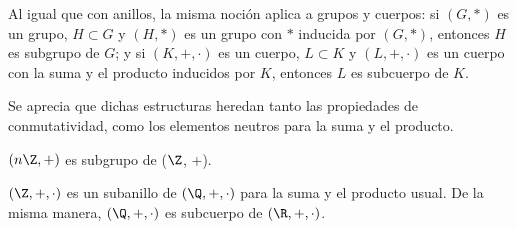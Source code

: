 \begin{TFGampliado}
    \begin{obss}
        \item Al igual que con anillos, la misma noción aplica a grupos y cuerpos: si $(G,\ast)$ es un grupo, $H \subset G$ y $(H,\ast)$ es un grupo con $\ast$ inducida por $(G,\ast)$, entonces $H$ es subgrupo de $G$; y si $(K,+,\cdot)$ es un cuerpo, $L \subset K$ y $(L,+,\cdot)$ es un cuerpo con la suma y el producto inducidos por $K$, entonces $L$ es subcuerpo de $K$. 
    
        \item Se aprecia que dichas estructuras heredan tanto las propiedades de conmutatividad, como los elementos neutros para la suma y el producto.
    \end{obss}

    \begin{ejs}
        \item$(n\Z, +)$ es subgrupo de ($\Z$, +).
        \item$(\Z, +, \cdot)$ es un subanillo de $(\Q, +, \cdot)$ para la suma y el producto usual. De la misma manera, $(\Q, +, \cdot)$ es subcuerpo de $(\R, +, \cdot)$. 
    \end{ejs}
\end{TFGampliado}

